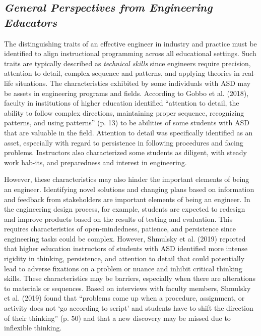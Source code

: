 \documentclass[11.5pt]{sig-alternate}
\begin{document}
\begin{large}
\subsection*{\textbf{\textit{General Perspectives from Engineering Educators}}}

The distinguishing traits of an effective engineer in industry and practice must be identified to align instructional programming across all educational settings. Such traits are typically described as \textit{technical skills} since engineers require precision, attention to detail, complex sequence and patterns, and applying theories in real-life situations. The characteristics exhibited by some individuals with ASD may be assets in engineering programs and fields. According to Gobbo et al. (2018), faculty in institutions of higher education identified “attention to detail, the ability to follow complex directions, maintaining proper sequence, recognizing patterns, and using patterns” (p. 13) to be abilities of some students with ASD that are valuable in the field. Attention to detail was specifically identified as an asset, especially with regard to persistence in following procedures and facing problems. Instructors also characterized some students as diligent, with steady work hab-its, and preparedness and interest in engineering. 

However, these characteristics may also hinder the important elements of being an engineer. Identifying novel solutions and changing plans based on information and feedback from stakeholders are important elements of being an engineer. In the engineering design process, for example, students are expected to redesign and improve products based on the results of testing and evaluation. This requires characteristics of open-mindedness, patience, and persistence since engineering tasks could be complex. However, Shmulsky et al. (2019) reported that higher education instructors of students with ASD identified more intense rigidity in thinking, persistence, and attention to detail that could potentially lead to adverse fixations on a problem or nuance and inhibit critical thinking skills. These characteristics may be barriers, especially when there are alterations to materials or sequences. Based on interviews with faculty members, Shmulsky et al. (2019) found that “problems come up when a procedure, assignment, or activity does not ‘go according to script’ and students have to shift the direction of their thinking” (p. 50) and that a new discovery may be missed due to inflexible thinking.


\end{large}
\end{document}
